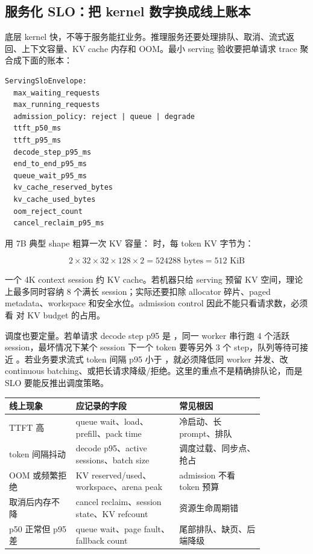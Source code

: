 \subsection{服务化 SLO：把 kernel 数字换成线上账本}

底层 kernel 快，不等于服务能扛业务。推理服务还要处理排队、取消、流式返回、上下文容量、KV cache 内存和 OOM。最小 serving 验收要把单请求 trace 聚合成下面的账本：

\begin{lstlisting}[numbers=none,caption={ServingSloEnvelope}]
ServingSloEnvelope:
  max_waiting_requests
  max_running_requests
  admission_policy: reject | queue | degrade
  ttft_p50_ms
  ttft_p95_ms
  decode_step_p95_ms
  end_to_end_p95_ms
  queue_wait_p95_ms
  kv_cache_reserved_bytes
  kv_cache_used_bytes
  oom_reject_count
  cancel_reclaim_p95_ms
\end{lstlisting}

用 7B 典型 shape 粗算一次 KV 容量： 时，每 token KV 字节为：

\[
2 \times 32 \times 32 \times 128 \times 2 = 524288 \text{ bytes} = 512 \text{ KiB}
\]

一个 4K context session 约  KV cache。若机器只给 serving 预留  KV 空间，理论上最多同时容纳 8 个满长 session；实际还要扣除 allocator 碎片、paged metadata、workspace 和安全水位。admission control 因此不能只看请求数，必须看  对 KV budget 的占用。

调度也要定量。若单请求 decode step p95 是 ，同一 worker 串行跑 4 个活跃 session，最坏情况下某个 session 下一个 token 要等另外 3 个 step，队列等待可接近 。若业务要求流式 token 间隔 p95 小于 ，就必须降低同 worker 并发、改 continuous batching、或把长请求降级/拒绝。这里的重点不是精确排队论，而是 SLO 要能反推出调度策略。

\begin{center}
\begin{tabular}{p{0.22\linewidth}p{0.34\linewidth}p{0.28\linewidth}}
\toprule
线上现象 & 应记录的字段 & 常见根因 \\
\midrule
TTFT 高 & queue wait、load、prefill、pack time & 冷启动、长 prompt、排队 \\
token 间隔抖动 & decode p95、active sessions、batch size & 调度过载、同步点、抢占 \\
OOM 或频繁拒绝 & KV reserved/used、workspace、arena peak & admission 不看 token 预算 \\
取消后内存不降 & cancel reclaim、session state、KV refcount & 资源生命周期错 \\
p50 正常但 p95 差 & queue wait、page fault、fallback count & 尾部排队、缺页、后端降级 \\
\bottomrule
\end{tabular}
\end{center}

